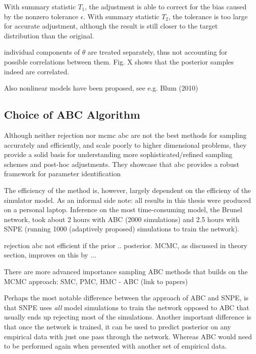 With summary statistic $T_1$, the adjustment is able to correct for the bias caused by the nonzero tolerance $\epsilon$. With summary statistic $T_2$, the tolerance is too large for accurate adjustment, although the result is still closer to the target distribution than the original.

individual components of $\theta$ are treated separately, thus not accounting for possible correlations between them. Fig. X shows that the posterior samples indeed are correlated.

Also nonlinear models have been proposed, see e.g. Blum (2010)

\subsection{Choice of ABC Algorithm}

Although neither rejection nor mcmc abc are not the best methods for sampling accurately and efficiently, and scale poorly to higher dimensional problems, they provide a solid basis for understanding more sophisticated/refined sampling schemes and post-hoc adjustments. They showcase that abc provides a robust framework for parameter identification


The efficiency of the method is, however, largely dependent on the efficieny of the simulator model. As an informal side note: all results in this thesis were produced on a personal laptop. Inference on the most time-consuming model, the Brunel network, took about 2 hours with ABC (2000 simulations) and 2.5 hours with SNPE (running 1000 (adaptively proposed) simulations to train the network). 

rejection abc not efficient if the prior .. posterior. MCMC, as discussed in theory section, improves on this by ... 

There are more advanced importance sampling ABC methods that builds on the MCMC approach: SMC, PMC, HMC - ABC (link to papers)

Perhaps the most notable difference between the approach of ABC and SNPE, is that SNPE uses \textit{all} model simulations to train the network opposed to ABC that usually ends up rejecting most of the simulations. Another important difference is that once the network is trained, it can be used to predict posterior on any empirical data with just one pass through the network. Whereas ABC would need to be performed again when presented with another set of empirical data. 

